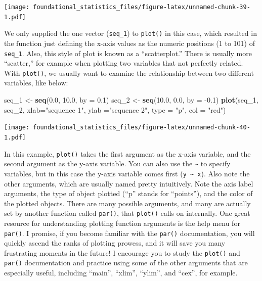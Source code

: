\documentclass[]{book}
\newenvironment{Shaded}{\begin{snugshade}}{\end{snugshade}}
\newcommand{\DataTypeTok}[1]{\textcolor[rgb]{0.13,0.29,0.53}{#1}}
\newcommand{\DecValTok}[1]{\textcolor[rgb]{0.00,0.00,0.81}{#1}}
\newcommand{\FloatTok}[1]{\textcolor[rgb]{0.00,0.00,0.81}{#1}}
\newcommand{\KeywordTok}[1]{\textcolor[rgb]{0.13,0.29,0.53}{\textbf{#1}}}
\newcommand{\NormalTok}[1]{#1}
\newcommand{\StringTok}[1]{\textcolor[rgb]{0.31,0.60,0.02}{#1}}
\begin{document}
\texttt{[image: foundational\_statistics\_files/figure-latex/unnamed-chunk-39-1.pdf]}

We only supplied the one vector (\texttt{seq\_1}) to \texttt{plot()} in this case, which resulted in the function just defining the x-axis values as the numeric positions (1 to 101) of \texttt{seq\_1}. Also, this style of plot is known as a ``scatterplot.'' There is usually more ``scatter,'' for example when plotting two variables that not perfectly related. With \texttt{plot()}, we usually want to examine the relationship between two different variables, like below:

\begin{Shaded}
\begin{Highlighting}[]
\NormalTok{seq_}\DecValTok{1}\NormalTok{ <-}\StringTok{ }\KeywordTok{seq}\NormalTok{(}\FloatTok{0.0}\NormalTok{, }\FloatTok{10.0}\NormalTok{, }\DataTypeTok{by =} \FloatTok{0.1}\NormalTok{)}
\NormalTok{seq_}\DecValTok{2}\NormalTok{ <-}\StringTok{ }\KeywordTok{seq}\NormalTok{(}\FloatTok{10.0}\NormalTok{, }\FloatTok{0.0}\NormalTok{, }\DataTypeTok{by =} \FloatTok{-0.1}\NormalTok{)}
\KeywordTok{plot}\NormalTok{(seq_}\DecValTok{1}\NormalTok{, seq_}\DecValTok{2}\NormalTok{, }\DataTypeTok{xlab=}\StringTok{"sequence 1"}\NormalTok{, }\DataTypeTok{ylab =}\StringTok{"sequence 2"}\NormalTok{, }\DataTypeTok{type =} \StringTok{"p"}\NormalTok{, }\DataTypeTok{col =} \StringTok{"red"}\NormalTok{)}
\end{Highlighting}
\end{Shaded}

\texttt{[image: foundational\_statistics\_files/figure-latex/unnamed-chunk-40-1.pdf]}

In this example, \texttt{plot()} takes the first argument as the x-axis variable, and the second argument as the y-axis variable. You can also use the \texttt{\textasciitilde{}} to specify variables, but in this case the y-axis variable comes first (\texttt{y\ \textasciitilde{}\ x}). Also note the other arguments, which are usually named pretty intuitively. Note the axis label arguments, the type of object plotted (``p'' stands for ``points''), and the color of the plotted objects. There are many possible arguments, and many are actually set by another function called \texttt{par()}, that \texttt{plot()} calls on internally. One great resource for understanding plotting function arguments is the help menu for \texttt{par()}. I promise, if you become familiar with the \texttt{par()} documentation, you will quickly ascend the ranks of plotting prowess, and it will save you many frustrating moments in the future! I encourage you to study the \texttt{plot()} and \texttt{par()} documentation and practice using some of the other arguments that are especially useful, including ``main'', ``xlim'', ``ylim'', and ``cex'', for example.
\end{document}
